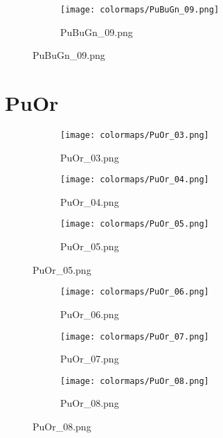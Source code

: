 \documentclass{article}%
\begin{document}
%
\hspace{1cm}\hfill%


\begin{figure}[h!]%
\begin{subfigure}[b]{0.3\linewidth}%
\texttt{[image: colormaps/PuBuGn\_09.png]}%
\caption{PuBuGn\_09.png}%
\end{subfigure}%
\end{figure}

%
\newpage%
\section{PuOr}%
\label{sec:PuOr}%
\hspace{1cm}\hfill%
\hspace{1cm}\hfill%
\hspace{1cm}\hfill%


\begin{figure}[h!]%
\begin{subfigure}[b]{0.3\linewidth}%
\texttt{[image: colormaps/PuOr\_03.png]}%
\caption{PuOr\_03.png}%
\end{subfigure}%
\begin{subfigure}[b]{0.3\linewidth}%
\texttt{[image: colormaps/PuOr\_04.png]}%
\caption{PuOr\_04.png}%
\end{subfigure}%
\begin{subfigure}[b]{0.3\linewidth}%
\texttt{[image: colormaps/PuOr\_05.png]}%
\caption{PuOr\_05.png}%
\end{subfigure}%
\end{figure}

%
\hspace{1cm}\hfill%
\hspace{1cm}\hfill%
\hspace{1cm}\hfill%


\begin{figure}[h!]%
\begin{subfigure}[b]{0.3\linewidth}%
\texttt{[image: colormaps/PuOr\_06.png]}%
\caption{PuOr\_06.png}%
\end{subfigure}%
\begin{subfigure}[b]{0.3\linewidth}%
\texttt{[image: colormaps/PuOr\_07.png]}%
\caption{PuOr\_07.png}%
\end{subfigure}%
\begin{subfigure}[b]{0.3\linewidth}%
\texttt{[image: colormaps/PuOr\_08.png]}%
\caption{PuOr\_08.png}%
\end{subfigure}%
\end{figure}
\end{document}
